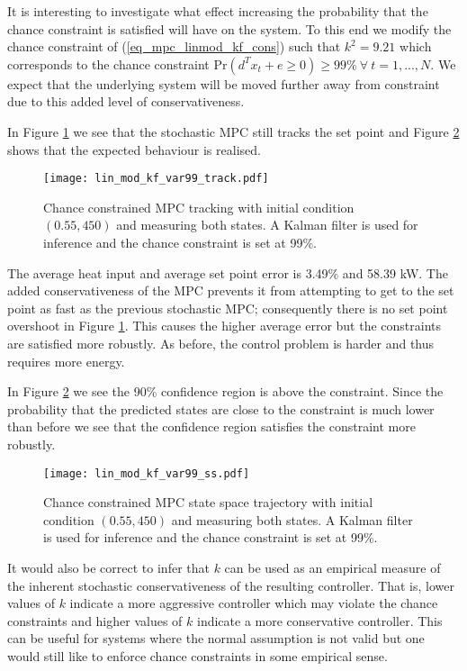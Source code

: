 It is interesting to investigate what effect increasing the probability that the chance constraint is satisfied will have on the system. To this end we modify the chance constraint of (\ref{eq_mpc_linmod_kf_cons}) such that $k^2 = 9.21$ which corresponds to the chance constraint $\text{Pr}(d^Tx_t + e \geq 0) \geq 99\% ~\forall ~t=1,...,N$. We expect that the underlying system will be moved further away from constraint due to this added level of conservativeness.

In Figure \ref{fig_lin_mod_kf_var99_track} we see that the stochastic MPC still tracks the set point and Figure \ref{fig_lin_mod_kf_var99_ss} shows that the expected behaviour is realised. 
\begin{figure}[H] 
\centering
\texttt{[image: lin\_mod\_kf\_var99\_track.pdf]}
\caption{Chance constrained MPC tracking with initial condition $(0.55, 450)$ and measuring both states. A Kalman filter is used for inference and the chance constraint is set at 99\%.}
\label{fig_lin_mod_kf_var99_track}
\end{figure}
The average heat input and average set point error is 3.49\% and  58.39 kW. The added conservativeness of the MPC prevents it from attempting to get to the set point as fast as the previous stochastic MPC; consequently there is no set point overshoot in Figure \ref{fig_lin_mod_kf_var99_track}. This causes the higher average error but the constraints are satisfied more robustly. As before, the control problem is harder and thus requires more energy.

In Figure \ref{fig_lin_mod_kf_var99_ss} we see the 90\% confidence region is above the constraint. Since the probability that the predicted states are close to the constraint is much lower than before we see that the confidence region satisfies the constraint more robustly.
\begin{figure}[H] 
\centering
\texttt{[image: lin\_mod\_kf\_var99\_ss.pdf]}
\caption{Chance constrained MPC state space trajectory with initial condition $(0.55, 450)$ and measuring both states. A Kalman filter is used for inference and the chance constraint is set at 99\%.}
\label{fig_lin_mod_kf_var99_ss}
\end{figure}
It would also be correct to infer that $k$ can be used as an empirical measure of the inherent stochastic conservativeness of the resulting controller. That is, lower values of $k$ indicate a more aggressive controller which may violate the chance constraints and higher values of $k$ indicate a more conservative controller. This can be useful for systems where the normal assumption is not valid but one would still like to enforce chance constraints in some empirical sense. 

